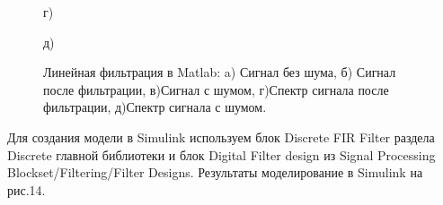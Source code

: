 \documentclass[10pt,a4paper]{article}
\begin{document}
\begin{figure}[H]
\vfill
\begin{minipage}[h]{0.6\linewidth}
 г) \\
\end{minipage}
\hfill
\begin{minipage}[h]{0.6\linewidth}
 д) \\
\end{minipage}
\caption{Линейная фильтрация в Matlab: a) Сигнал без шума, б)
Сигнал после фильтрации, в)Сигнал с шумом, г)Спектр сигнала после фильтрации, д)Спектр сигнала с шумом.}
\label{ris:experimentalcorrelationsignals}
\end{figure}
Для создания модели в Simulink используем блок Discrete FIR Filter раздела Discrete главной библиотеки и блок Digital Filter design из Signal Processing Blockset/Filtering/Filter Designs. Результаты моделирование в Simulink на рис.14.
\end{document}
